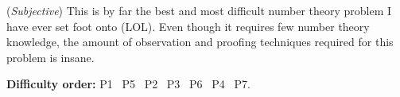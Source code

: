 \documentclass[11pt]{article}
\begin{document}
        \begin{remark}
            (\emph{Subjective}) This is by far the best and most difficult number theory problem I have ever set foot onto (LOL). Even though it requires few number theory knowledge, the amount of observation and proofing techniques required for this problem is insane.
        \end{remark}

        \textbf{Difficulty order:} P1 \textrightarrow \ P5 \textrightarrow \ P2 \textrightarrow \ P3 \textrightarrow \ P6 \textrightarrow \ P4 \textrightarrow \ P7.
\end{document}

